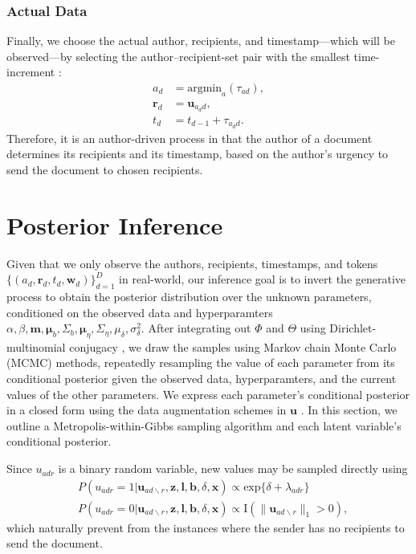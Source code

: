 \documentclass{article}
\begin{document}
\subsubsection{Actual Data}\label{subsubsec:Actual Data}
Finally, we choose the actual author, recipients, and timestamp---which will be observed---by selecting the author--recipient-set pair with the smallest time-increment \cite{snijders1996stochastic,snijders2017stochastic}:
\begin{equation}
\begin{aligned}
a_d &= \mbox{argmin}_{a}(\tau_{ad}),\\
\boldsymbol{r}_d &= \boldsymbol{u}_{a_d d},\\
t_d &=t_{d-1} + \tau_{a_d d}.
\end{aligned}
\end{equation}
Therefore, it is an author-driven process in that the author of a document determines its recipients and its timestamp, based on the author's urgency to send the document to chosen recipients. 

\section{Posterior Inference}\label{sec:Inference}
Given that we only observe the authors, recipients, timestamps, and tokens $ \{ (a_d, \boldsymbol{r}_d, t_d,  \boldsymbol{w}_d)\}_{d=1}^D$ in real-world, our inference goal is to invert the generative process to obtain the posterior distribution over the unknown parameters, conditioned on the observed data and hyperparamters $\alpha, \beta, \boldsymbol{m}, \boldsymbol{\mu}_b, \Sigma_b, \boldsymbol{\mu}_\eta, \Sigma_\eta, {\mu}_\delta,\sigma^2_\delta$. After integrating out $\Phi$ and $\Theta$ using Dirichlet-multinomial conjugacy \cite{griffiths2004finding}, we draw the samples using Markov chain Monte Carlo (MCMC) methods, repeatedly resampling the value of each parameter from its conditional posterior given the observed data, hyperparamters, and the current values of the other parameters. We express each parameter’s conditional posterior in a closed form using the data augmentation schemes in $\boldsymbol{u}$ \cite{tanner1987calculation}. In this section, we outline a Metropolis-within-Gibbs sampling algorithm and each latent variable's conditional posterior.

Since $u_{adr}$ is a binary random variable, new values may be sampled directly using
\begin{equation}
\begin{aligned}
 &P(u_{adr}=1| \boldsymbol{u}_{ad\backslash r}, \boldsymbol{z},\boldsymbol{l},\boldsymbol{b}, \delta, \boldsymbol{x})
 \propto \mbox{exp}\{\delta+\lambda_{adr}\}\\
 &P(u_{adr}=0| \boldsymbol{u}_{ad\backslash r}, \boldsymbol{z},\boldsymbol{l},\boldsymbol{b}, \delta, \boldsymbol{x})\propto \text{I}(\lVert\boldsymbol{u}_{ad\backslash r}\rVert_1 > 0 ),
\end{aligned}
\label{eqn:latentreceiver}
\end{equation}
which naturally prevent from the instances where the sender has no recipients to send the document.
\end{document}
